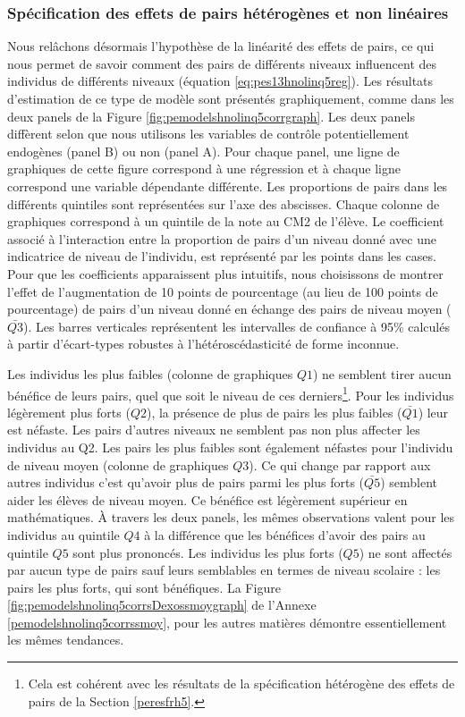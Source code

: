 \documentclass[
]{book}
\begin{document}
\hypertarget{peresfrhnolinq5}{%
\subsubsection{Spécification des effets de pairs hétérogènes et non linéaires}\label{peresfrhnolinq5}}

Nous relâchons désormais l'hypothèse de la linéarité des effets de pairs, ce qui nous permet de savoir comment des pairs de différents niveaux influencent des individus de différents niveaux (équation \ref{eq:pes13hnolinq5reg}). Les résultats d'estimation de ce type de modèle sont présentés graphiquement, comme dans les deux panels de la Figure \ref{fig:pemodelshnolinq5corrgraph}. Les deux panels diffèrent selon que nous utilisons les variables de contrôle potentiellement endogènes (panel B) ou non (panel A). Pour chaque panel, une ligne de graphiques de cette figure correspond à une régression et à chaque ligne correspond une variable dépendante différente. Les proportions de pairs dans les différents quintiles sont représentées sur l'axe des abscisses. Chaque colonne de graphiques correspond à un quintile de la note au CM2 de l'élève. Le coefficient associé à l'interaction entre la proportion de pairs d'un niveau donné avec une indicatrice de niveau de l'individu, est représenté par les points dans les cases. Pour que les coefficients apparaissent plus intuitifs, nous choisissons de montrer l'effet de l'augmentation de 10 points de pourcentage (au lieu de 100 points de pourcentage) de pairs d'un niveau donné en échange des pairs de niveau moyen (\(\bar{Q3}\)). Les barres verticales représentent les intervalles de confiance à 95\% calculés à partir d'écart-types robustes à l'hétéroscédasticité de forme inconnue.

\quad Les individus les plus faibles (colonne de graphiques \(Q1\)) ne semblent tirer aucun bénéfice de leurs pairs, quel que soit le niveau de ces derniers\footnote{Cela est cohérent avec les résultats de la spécification hétérogène des effets de pairs de la Section \ref{peresfrh5}.}. Pour les individus légèrement plus forts (\(Q2\)), la présence de plus de pairs les plus faibles (\(\bar{Q1}\)) leur est néfaste. Les pairs d'autres niveaux ne semblent pas non plus affecter les individus au Q2.
Les pairs les plus faibles sont également néfastes pour l'individu de niveau moyen (colonne de graphiques \(Q3\)). Ce qui change par rapport aux autres individus c'est qu'avoir plus de pairs parmi les plus forts (\(\bar{Q5}\)) semblent aider les élèves de niveau moyen. Ce bénéfice est légèrement supérieur en mathématiques.
À travers les deux panels, les mêmes observations valent pour les individus au quintile \(Q4\) à la différence que les bénéfices d'avoir des pairs au quintile \(Q5\) sont plus prononcés.
Les individus les plus forts (\(Q5\)) ne sont affectés par aucun type de pairs sauf leurs semblables en termes de niveau scolaire : les pairs les plus forts, qui sont bénéfiques.
La Figure \ref{fig:pemodelshnolinq5corrsDexossmoygraph} de l'Annexe \ref{pemodelshnolinq5corrssmoy}, pour les autres matières démontre essentiellement les mêmes tendances.
\end{document}
